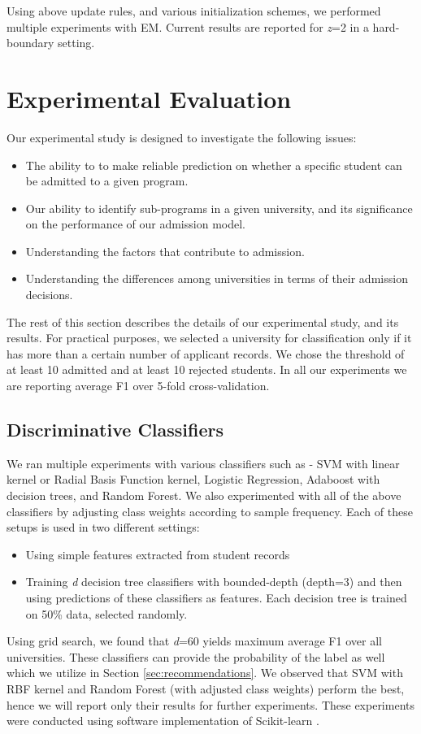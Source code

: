 \documentclass{sig-alternate-05-2015}
\begin{document}
Using above update rules, and various initialization schemes, we performed multiple experiments with EM. Current results are reported for \textit{z}=2 in a hard-boundary setting.


\section{Experimental Evaluation}
\label{sec:experiments}
Our experimental study is designed to investigate the following issues:
\begin{itemize}
\item The ability to to make reliable prediction on whether a specific student can be admitted to a given program.
\item Our ability to identify sub-programs in a given university, and its significance on the performance of our admission model. 
\item Understanding the factors that contribute to admission.
\item Understanding the differences among universities in terms of their admission decisions.
\end{itemize}
The rest of this section describes the details of our experimental study, and its results. For practical purposes, we selected a university for classification only if it has more than a certain number of applicant records. We chose the threshold of at least 10 admitted and at least 10 rejected students. In all our experiments we are reporting average F1 over 5-fold cross-validation.

\subsection{Discriminative Classifiers}
\label{subsec:supervised-exp}
We ran multiple experiments with various classifiers such as - SVM with linear kernel or Radial Basis Function kernel, Logistic Regression, Adaboost with decision trees, and Random Forest. We also experimented with all of the above classifiers by adjusting class weights according to sample frequency. Each of these setups is used in two different settings:
\begin{itemize}
\item Using simple features extracted from student records
\item Training \textit{d} decision tree classifiers with bounded-depth (depth=3) and then using predictions of these classifiers as features. Each decision tree is trained on 50\% data, selected randomly.
\end{itemize}
Using grid search, we found that \textit{d}=60 yields maximum average F1 over all universities. These classifiers can provide the probability of the label as well which we utilize in Section \ref{sec:recommendations}. We observed that SVM with RBF kernel and Random Forest (with adjusted class weights) perform the best, hence we will report only their results for further experiments. These experiments were conducted using software implementation of Scikit-learn \cite{scikit-learn}.
\end{document}
